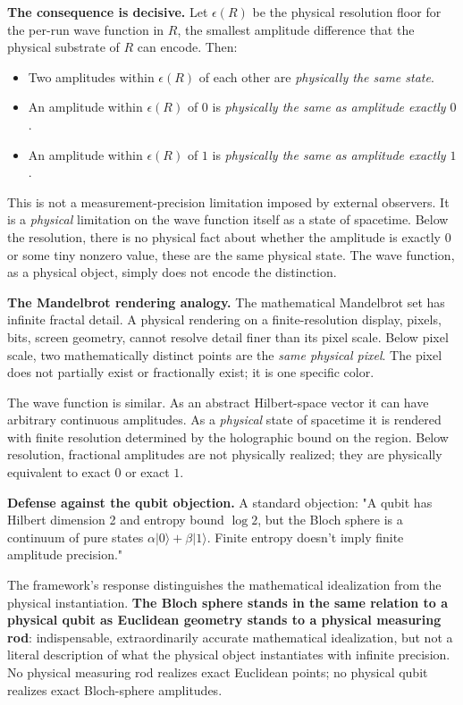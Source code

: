 \documentclass[11pt,a4paper]{article}
\begin{document}
\textbf{The consequence is decisive.} Let $\epsilon(R)$ be the physical resolution floor for the per-run wave function in $R$, the smallest amplitude difference that the physical substrate of $R$ can encode. Then:

\begin{itemize}
  \item Two amplitudes within $\epsilon(R)$ of each other are \emph{physically the same state}.
  \item An amplitude within $\epsilon(R)$ of $0$ is \emph{physically the same as amplitude exactly $0$}.
  \item An amplitude within $\epsilon(R)$ of $1$ is \emph{physically the same as amplitude exactly $1$}.
\end{itemize}

This is not a measurement-precision limitation imposed by external observers. It is a \emph{physical} limitation on the wave function itself as a state of spacetime. Below the resolution, there is no physical fact about whether the amplitude is exactly $0$ or some tiny nonzero value, these are the same physical state. The wave function, as a physical object, simply does not encode the distinction.

\textbf{The Mandelbrot rendering analogy.} The mathematical Mandelbrot set has infinite fractal detail. A physical rendering on a finite-resolution display, pixels, bits, screen geometry, cannot resolve detail finer than its pixel scale. Below pixel scale, two mathematically distinct points are the \emph{same physical pixel}. The pixel does not partially exist or fractionally exist; it is one specific color.

The wave function is similar. As an abstract Hilbert-space vector it can have arbitrary continuous amplitudes. As a \emph{physical} state of spacetime it is rendered with finite resolution determined by the holographic bound on the region. Below resolution, fractional amplitudes are not physically realized; they are physically equivalent to exact $0$ or exact $1$.

\textbf{Defense against the qubit objection.} A standard objection: "A qubit has Hilbert dimension 2 and entropy bound $\log 2$, but the Bloch sphere is a continuum of pure states $\alpha|0\rangle + \beta|1\rangle$. Finite entropy doesn't imply finite amplitude precision."

The framework's response distinguishes the mathematical idealization from the physical instantiation. \textbf{The Bloch sphere stands in the same relation to a physical qubit as Euclidean geometry stands to a physical measuring rod}: indispensable, extraordinarily accurate mathematical idealization, but not a literal description of what the physical object instantiates with infinite precision. No physical measuring rod realizes exact Euclidean points; no physical qubit realizes exact Bloch-sphere amplitudes.
\end{document}
